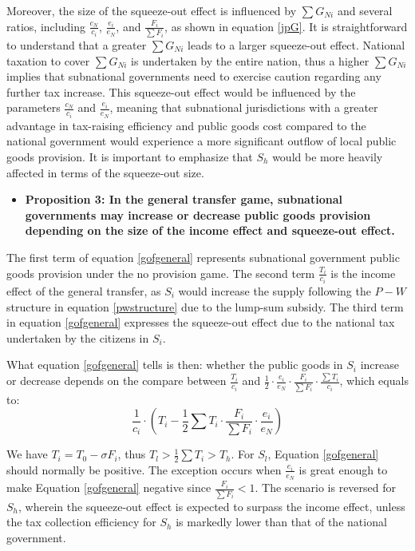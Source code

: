 \documentclass[man]{apa7}
\begin{document}
Moreover, the size of the squeeze-out effect is influenced by $\sum G_{Ni}$ and several ratios, including $\frac{c_N}{c_i}$, $\frac{e_i}{e_N}$, and $\frac{F_i}{\sum F_i}$, as shown in equation \ref{jpG}. It is straightforward to understand that a greater $\sum G_{Ni}$ leads to a larger squeeze-out effect. National taxation to cover $\sum G_{Ni}$ is undertaken by the entire nation, thus a higher $\sum G_{Ni}$ implies that subnational governments need to exercise caution regarding any further tax increase. This squeeze-out effect would be influenced by the parameters $\frac{c_N}{c_i}$ and $\frac{e_i}{e_N}$, meaning that subnational jurisdictions with a greater advantage in tax-raising efficiency and public goods cost compared to the national government would experience a more significant outflow of local public goods provision. It is important to emphasize that $S_h$ would be more heavily affected in terms of the squeeze-out size.

\begin{itemize}
  \item \textbf{Proposition 3: In the general transfer game, subnational governments may increase or decrease public goods provision depending on the size of the income effect and squeeze-out effect.}
\end{itemize}
The first term of equation \ref{gofgeneral} represents subnational government public goods provision under the no provision game. The second term $\frac{T_i}{c_i}$ is the income effect of the general transfer, as $S_i$ would increase the supply following the $P-W$ structure in equation \ref{pwstructure} due to the lump-sum subsidy. The third term in equation \ref{gofgeneral} expresses the squeeze-out effect due to the national tax undertaken by the citizens in $S_i$.

What equation \ref{gofgeneral} tells is then: whether the public goods in $S_i$ increase or decrease depends on the compare between $\frac{T_i}{c_i}$ and $\frac{1}{2} \cdot \frac{e_i}{e_N}\cdot \frac{F_i}{\sum F_i} \cdot \frac{\sum T_i}{c_i}$, which equals to:
\begin{equation}
  \frac{1}{c_i}\cdot (T_i-\frac{1}{2}\sum T_i\cdot \frac{F_i}{\sum F_i}\cdot \frac{e_i}{e_N})
\end{equation}


We have $T_i=T_0 - \sigma F_i$, thus $T_l>\frac{1}{2}\sum T_i >T_h$. For $S_l$, Equation \ref{gofgeneral} should normally be positive. The exception occurs when $\frac{e_i}{e_N}$ is great enough to make Equation \ref{gofgeneral} negative since $\frac{F_i}{\sum F_i}<1$. The scenario is reversed for $S_h$, wherein the squeeze-out effect is expected to surpass the income effect, unless the tax collection efficiency for $S_h$ is markedly lower than that of the national government. %
\end{document}
